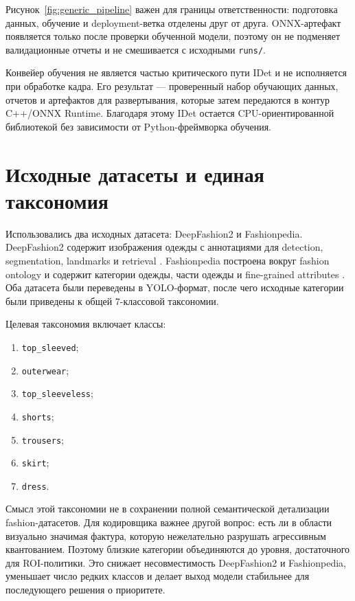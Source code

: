 \documentclass[12pt,a4paper,oneside,openany]{report}
\begin{document}
Рисунок~\ref{fig:generic_pipeline} важен для границы ответственности: подготовка данных,
обучение и deployment-ветка отделены друг от друга. ONNX-артефакт появляется только после
проверки обученной модели, поэтому он не подменяет валидационные отчеты и не смешивается с
исходными \texttt{runs/}.

Конвейер обучения не является частью критического пути IDet и не исполняется при обработке
кадра. Его результат --- проверенный набор обучающих данных, отчетов и артефактов для
развертывания, которые затем передаются в контур C++/ONNX Runtime. Благодаря этому IDet остается
CPU-ориентированной библиотекой без зависимости от Python-фреймворка обучения.


\section{Исходные датасеты и единая таксономия}

Использовались два исходных датасета: DeepFashion2 и Fashionpedia. DeepFashion2 содержит
изображения одежды с аннотациями для detection, segmentation, landmarks и retrieval
\cite{deepfashion2}. Fashionpedia построена вокруг fashion ontology и содержит категории одежды,
части одежды и fine-grained attributes \cite{fashionpedia}. Оба датасета были переведены в
YOLO-формат, после чего исходные категории были приведены к общей 7-классовой таксономии.

Целевая таксономия включает классы:
\begin{enumerate}[label=\arabic*)]
  \item \texttt{top\_sleeved};
  \item \texttt{outerwear};
  \item \texttt{top\_sleeveless};
  \item \texttt{shorts};
  \item \texttt{trousers};
  \item \texttt{skirt};
  \item \texttt{dress}.
\end{enumerate}

Смысл этой таксономии не в сохранении полной семантической детализации fashion-датасетов. Для
кодировщика важнее другой вопрос: есть ли в области визуально значимая фактура, которую
нежелательно разрушать агрессивным квантованием. Поэтому близкие категории объединяются до
уровня, достаточного для ROI-политики. Это снижает несовместимость DeepFashion2 и Fashionpedia,
уменьшает число редких классов и делает выход модели стабильнее для последующего решения о
приоритете.
\end{document}
